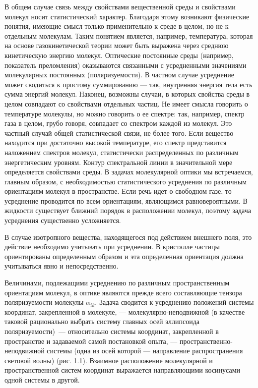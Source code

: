 В общем случае связь между свойствами вещественной среды и
свойствами молекул носит статистический характер. Благодаря этому
возникают физические понятия, имеющие смысл только применительно к
среде в целом, но не к отдельным молекулам. Таким понятием
является, например, температура, которая на основе
газокинетической теории может быть выражена через среднюю
кинетическую энергию молекул. Оптические постоянные среды
(например, показатель преломления) оказываются связанными с
усредненными значениями молекулярных постоянных (поляризуемости).
В частном случае усреднение может сводиться к простому
суммированию --- так, внутренняя энергия тела есть сумма энергий
молекул. Наконец, возможны случаи, в которых свойства среды в
целом совпадают со свойствами отдельных частиц. Не имеет смысла
говорить о температуре молекулы, но можно говорить о ее спектре:
так, например, спектр газа в целом, грубо говоря, совпадает со
спектром каждой из молекул. Это частный случай общей
статистической  связи, не более того. Если вещество находится при достаточно
высокой температуре, его спектр представится наложением спектров
молекул, статистически распределенных по различным энергетическим
уровням. Контур спектральной линии в значительной мере
определяется свойствами среды. В задачах молекулярной оптики мы
встречаемся, главным образом, с необходимостью статистического
усреднения по различным ориентациям молекул в пространстве. Если
речь идет о свободном газе, то усреднение проводится по всем
ориентациям, являющимся равновероятными. В жидкости существует
ближний порядок в расположении молекул, поэтому задача усреднения
существенно усложняется.

В случае изотропного вещества, находящегося под действием внешнего
поля, это действие необходимо учитывать при усреднении. В
кристалле частицы ориентированы определенным образом и эта
определенная ориентация должна учитываться явно и непосредственно.

Величинами, подлежащими усреднению по различным пространственным
ориентациям молекул, в оптике являются прежде всего составляющие
тензора поляризуемости молекулы $\alpha_{ik}$. Задача сводится к
усреднению положений системы координат, закрепленной в молекуле,
--- молекулярно-неподвижной (в качестве таковой рационально
выбрать систему главных осей эллипсоида поляризуемости)~---
относительно системы координат, закрепленной в пространстве и
задаваемой самой постановкой опыта, --- пространственно-неподвижной
системы (одна из осей которой --- направление распространения
световой волны) (рис. 1.1). Взаимное расположение молекулярной и
пространственной систем координат выражается направляющими
косинусами одной системы в другой.\vskip -2mm

